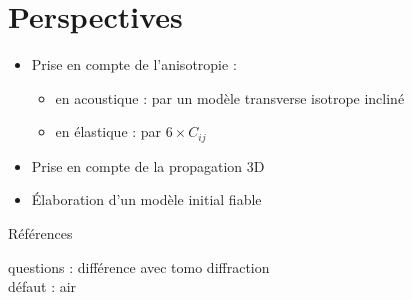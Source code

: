 \documentclass[10pt,xcolor=x11names,compress, notes=show]{beamer}%
\begin{document}
\begin{frame}{\insertsectionhead}
\begin{small}
\begin{columns}
		
	\end{columns}	

\end{small}
\end{frame}


\section{Perspectives}
\begin{frame}{\insertsectionhead}
	\begin{itemize}
		\item Prise en compte de l'anisotropie : 
			\begin{itemize}
				\item en acoustique : par un modèle transverse isotrope incliné
				\item en élastique : par $6\times C_{ij}$ 
			\end{itemize}
		\item Prise en compte de la propagation 3D
		\item Élaboration d'un modèle initial fiable 
	\end{itemize}
\end{frame}












\begin{frame}[allowframebreaks]{Références}

	\begin{adjustwidth}{-2em}{-2.5em}
		\scriptsize
		
		
	\end{adjustwidth}
\end{frame}

\begin{frame}
	questions : différence avec tomo diffraction\\
	défaut : air
\end{frame}
\end{document}
